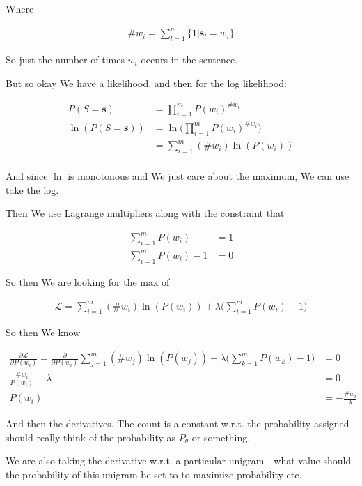\documentclass{article}
\begin{document}
		Where
		
		\begin{align}
			\# w_i = \sum^n_{l = 1} \{1|\mathbf{s}_l = w_i \}
		\end{align}
		
		So just the number of times $w_i$ occurs in the sentence.
		
		But so okay We have a likelihood, and then for the log likelihood:
		
		\begin{align}
			P(S=\mathbf{s}) &= \prod^m_{i=1} P(w_i)^{\#w_i}\\
			\ln(P(S=\mathbf{s})) &= \ln\bigg(\prod^m_{i=1} P(w_i)^{\#w_i}\bigg)\\
			&= \sum^m_{i=1} (\#w_i)\ln (P(w_i))\\
		\end{align}
		
		And since $\ln$ is monotonous and We just care about the maximum, We can use take the log.
		
		Then We use Lagrange multipliers along with the constraint that 
		
		\begin{align}
			\sum^m_{i=1} P(w_i) &= 1\\
			\sum^m_{i=1} P(w_i)-1 &= 0
		\end{align}
		
		So then We are looking for the max of 
		
		\begin{align}
			\mathcal{L}	= \sum^m_{i=1} (\#w_i)\ln (P(w_i)) + \lambda\bigg( \sum^m_{i=1} P(w_i) - 1 \bigg)
		\end{align}
		
		So then We know
		
		\begin{align}
			\frac{\partial \mathcal{L}}{\partial P(w_i)}	= \frac{\partial }{\partial P(w_i)} \sum^m_{j=1} (\#w_j)\ln (P(w_j)) + \lambda\bigg( \sum^m_{k=1} P(w_k) - 1 \bigg) &= 0\\
			\frac{\#w_i}{P(w_i)} + \lambda &= 0\\
			P(w_i)&= -\frac{\#w_i}{\lambda} 
		\end{align}
		
		And then the derivatives. The count is a constant w.r.t. the probability assigned - should really think of the probability as $P_\theta$ or something.
		
		We are also taking the derivative w.r.t. a particular unigram - what value should the probability of this unigram be set to to maximize probability etc.
		
\end{document}
